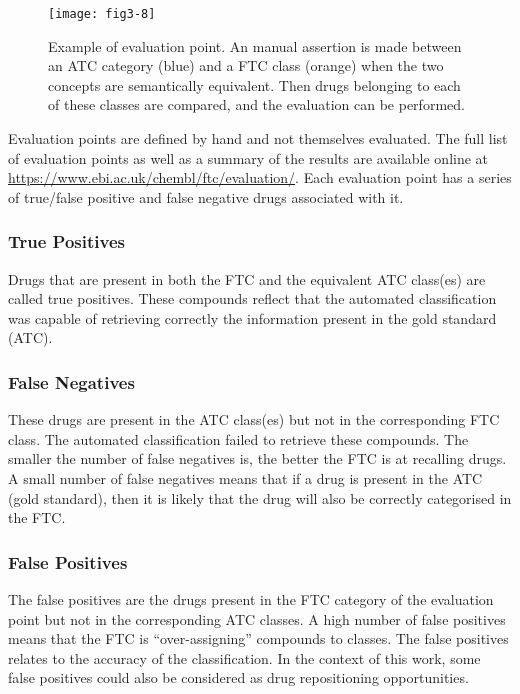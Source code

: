 \begin{figure}[ht]
    \centering
    \texttt{[image: fig3-8]}
    \caption{Example of evaluation point. An manual assertion is made between an ATC category (blue) and a FTC class (orange) when the two concepts are semantically equivalent. Then drugs belonging to each of these classes are compared, and the evaluation can be performed.}
    \label{fig3-8}
\end{figure}

Evaluation points are defined by hand and not themselves evaluated. The full list of evaluation points as well as a summary of the results are available online at \url{https://www.ebi.ac.uk/chembl/ftc/evaluation/}. Each evaluation point has a series of true/false positive and false negative drugs associated with it.

\subsubsection{True Positives}
Drugs that are present in both the FTC and the equivalent ATC class(es) are called true positives. These compounds reflect that the automated classification was capable of retrieving correctly the information present in the gold standard (ATC).

\subsubsection{False Negatives}
These drugs are present in the ATC class(es) but not in the corresponding FTC class. The automated classification failed to retrieve these compounds. The smaller the number of false negatives is, the better the FTC is at recalling drugs. A small number of false negatives means that if a drug is present in the ATC (gold standard), then it is likely that the drug will also be correctly categorised in the FTC.

\subsubsection{False Positives}
The false positives are the drugs present in the FTC category of the evaluation point but not in the corresponding ATC classes. A high number of false positives means that the FTC is ``over-assigning'' compounds to classes. The false positives relates to the accuracy of the classification. In the context of this work, some false positives could also be considered as drug repositioning opportunities.

